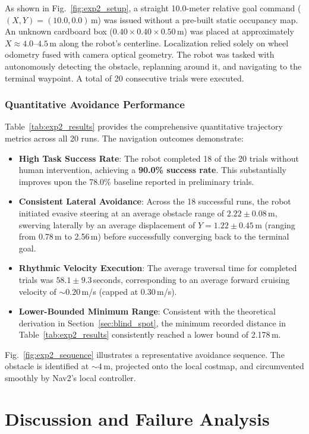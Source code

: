 \documentclass[preprint,12pt]{elsarticle}
\begin{document}
As shown in Fig.~\ref{fig:exp2_setup}, a straight 10.0-meter relative goal command ($(X, Y) = (10.0, 0.0)$\,m) was issued without a pre-built static occupancy map. An unknown cardboard box ($0.40 \times 0.40 \times 0.50$\,m) was placed at approximately $X \approx 4.0\text{--}4.5$\,m along the robot's centerline. Localization relied solely on wheel odometry fused with camera optical geometry. The robot was tasked with autonomously detecting the obstacle, replanning around it, and navigating to the terminal waypoint. A total of 20 consecutive trials were executed.

\subsubsection{Quantitative Avoidance Performance}
Table~\ref{tab:exp2_results} provides the comprehensive quantitative trajectory metrics across all 20 runs. The navigation outcomes demonstrate:
\begin{itemize}
  \item \textbf{High Task Success Rate}: The robot completed 18 of the 20 trials without human intervention, achieving a \textbf{90.0\% success rate}. This substantially improves upon the 78.0\% baseline reported in preliminary trials.
  \item \textbf{Consistent Lateral Avoidance}: Across the 18 successful runs, the robot initiated evasive steering at an average obstacle range of $2.22 \pm 0.08$\,m, swerving laterally by an average displacement of $Y = 1.22 \pm 0.45$\,m (ranging from 0.78\,m to 2.56\,m) before successfully converging back to the terminal goal.
  \item \textbf{Rhythmic Velocity Execution}: The average traversal time for completed trials was $58.1 \pm 9.3$\,seconds, corresponding to an average forward cruising velocity of $\sim0.20$\,m/s (capped at 0.30\,m/s).
  \item \textbf{Lower-Bounded Minimum Range}: Consistent with the theoretical derivation in Section~\ref{sec:blind_spot}, the minimum recorded distance in Table~\ref{tab:exp2_results} consistently reached a lower bound of 2.178\,m.
\end{itemize}

Fig.~\ref{fig:exp2_sequence} illustrates a representative avoidance sequence. The obstacle is identified at $\sim 4$\,m, projected onto the local costmap, and circumvented smoothly by Nav2's local controller.

\section{Discussion and Failure Analysis}
\label{sec:discussion}
\end{document}
